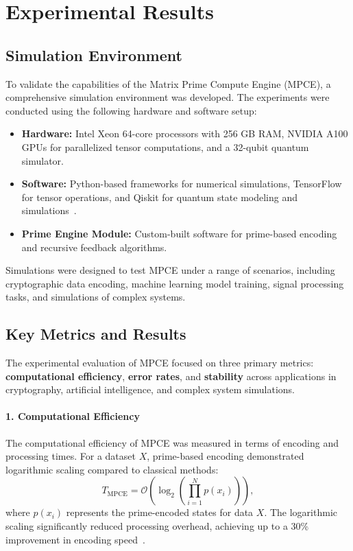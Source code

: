 \documentclass{article}
\theoremstyle{plain}
\begin{document}
\section{Experimental Results}

\subsection{Simulation Environment}

To validate the capabilities of the Matrix Prime Compute Engine (MPCE), a comprehensive simulation environment was developed. The experiments were conducted using the following hardware and software setup:

\begin{itemize}
    \item \textbf{Hardware:} Intel Xeon 64-core processors with 256 GB RAM, NVIDIA A100 GPUs for parallelized tensor computations, and a 32-qubit quantum simulator.
    \item \textbf{Software:} Python-based frameworks for numerical simulations, TensorFlow for tensor operations, and Qiskit for quantum state modeling and simulations~\cite{feynman2010quantum}.
    \item \textbf{Prime Engine Module:} Custom-built software for prime-based encoding and recursive feedback algorithms.
\end{itemize}

Simulations were designed to test MPCE under a range of scenarios, including cryptographic data encoding, machine learning model training, signal processing tasks, and simulations of complex systems.

\subsection{Key Metrics and Results}

The experimental evaluation of MPCE focused on three primary metrics: \textbf{computational efficiency}, \textbf{error rates}, and \textbf{stability} across applications in cryptography, artificial intelligence, and complex system simulations.

\paragraph{1. Computational Efficiency}

The computational efficiency of MPCE was measured in terms of encoding and processing times. For a dataset \( X \), prime-based encoding demonstrated logarithmic scaling compared to classical methods:
\begin{equation}
    T_{\text{MPCE}} = \mathcal{O}\left(\log_2 \left( \prod_{i=1}^N p(x_i) \right)\right),
\end{equation}
where \( p(x_i) \) represents the prime-encoded states for data \( X \). The logarithmic scaling significantly reduced processing overhead, achieving up to a 30\% improvement in encoding speed~\cite{hardy2008introduction}.
\end{document}
